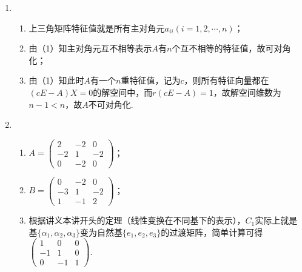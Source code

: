 \begin{enumerate}
    \item \begin{enumerate}
        \item 上三角矩阵特征值就是所有主对角元$a_{ii}(i=1,2,\cdots,n)$；
        \item 由（1）知主对角元互不相等表示$A$有$n$个互不相等的特征值，故可对角化；
        \item 由（1）知此时$A$有一个$n$重特征值，记为$c$，则所有特征向量都在$(cE-A)X=0$的解空间中，而$r(cE-A)=1$，故解空间维数为$n-1<n$，故$A$不可对角化.
    \end{enumerate}

    \item \begin{enumerate}
        \item $A=\begin{pmatrix}
            2 & -2 & 0 \\ -2 & 1 & -2 \\ 0 & -2 & 0
        \end{pmatrix}$；
        \item $B=\begin{pmatrix}
            0 & -2 & 0 \\ -3 & 1 & -2 \\ 1 & -1 & 2
        \end{pmatrix}$；
        \item 根据讲义本讲开头的定理（线性变换在不同基下的表示），$C_1$实际上就是基$\{\alpha_1,\alpha_2,\alpha_3\}$变为自然基$\{e_1,e_2,e_3\}$的过渡矩阵，简单计算可得$\begin{pmatrix}
            1 & 0 & 0 \\ -1 & 1 & 0 \\ 0 & -1 & 1
        \end{pmatrix}$.
    \end{enumerate}


\end{enumerate}
